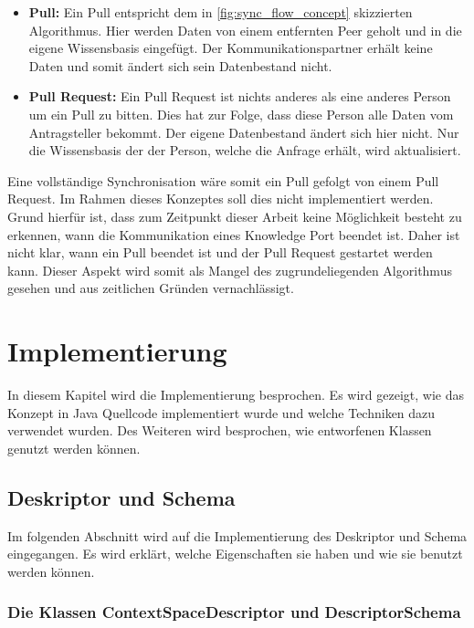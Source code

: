 \documentclass[a4paper]{article}
\begin{document}
	\begin{itemize}
		\item \textbf{Pull:} Ein Pull entspricht dem in
		\autoref{fig:sync_flow_concept} skizzierten Algorithmus. Hier werden
		Daten von einem entfernten Peer geholt und in die eigene Wissensbasis
		eingefügt. Der Kommunikationspartner erhält keine Daten und somit ändert
		sich sein Datenbestand nicht.
		\item \textbf{Pull Request:} Ein Pull Request ist nichts anderes als eine
		anderes Person um ein Pull zu bitten. Dies hat zur Folge, dass diese
		Person alle Daten vom Antragsteller bekommt. Der eigene Datenbestand 
		ändert sich hier nicht. Nur die Wissensbasis der der Person, welche die
		Anfrage erhält, wird aktualisiert.	
	\end{itemize} 
	
	Eine vollständige Synchronisation wäre somit ein Pull gefolgt von einem
	Pull Request. Im Rahmen dieses Konzeptes soll dies nicht implementiert werden.
	Grund hierfür ist, dass zum	Zeitpunkt dieser Arbeit keine Möglichkeit besteht 
	zu erkennen, wann die Kommunikation eines Knowledge Port beendet ist. 
	Daher ist nicht klar, wann ein Pull beendet ist und der Pull Request gestartet 
	werden kann. Dieser Aspekt wird somit als Mangel des zugrundeliegenden
	Algorithmus gesehen und aus zeitlichen Gründen vernachlässigt.
	
	\newpage
	\section{Implementierung}
	
	In diesem Kapitel wird die Implementierung besprochen. Es wird gezeigt, wie
	das Konzept in Java Quellcode implementiert wurde und welche Techniken dazu
	verwendet wurden. Des Weiteren wird besprochen, wie entworfenen Klassen 
	genutzt werden können.
	
	\subsection{Deskriptor und Schema}
	
	Im folgenden Abschnitt wird auf die Implementierung des Deskriptor und Schema
	eingegangen. Es wird erklärt, welche Eigenschaften sie haben und wie sie benutzt
	werden können.
	
	\subsubsection{Die Klassen ContextSpaceDescriptor und DescriptorSchema}
	
\end{document}

